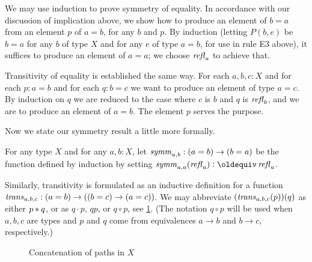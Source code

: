 We may use induction to prove symmetry of equality.  In accordance with our discussion of implication above, we show how to produce an element
of $b=a$ from an element $p$ of $a=b$, for any $b$ and $p$.  By induction (letting $P(b,e)$ be $b=a$ for any $b$ of type $X$ and for any $e$ of
type $a=b$, for use in rule E3 above), it suffices to produce an element of $a=a$; we choose $\mathop{{\it refl}_{a}}$ to achieve that.

Transitivity of equality is established the same way.  For each $a,b,c:X$ and for each $p:a=b$ and for each $q:b=c$ we want to produce an
element of type $a=c$.  By induction on $q$ we are reduced to the case where $c$ is $b$ and $q$ is $\mathop{{\it refl}_{b}}$, and we are to produce an element
of $a=b$.  The element $p$ serves the purpose.  

Now we state our symmetry result a little more formally.

\begin{definition}\label{def:eq-symm}
  For any type $X$ and for any $a,b:X$, let $\mathop{\mathit{symm}}_{a,b} : (a=b) \to (b=a)$ be the function defined by induction by setting
  $\symm_{a,a}(\refl a) \defeq \refl a$.
\end{definition}

Similarly, transitivity is formulated as an inductive definition for a function $\mathop{\mathit{trans}}_{a,b,c} : (a=b) \to ((b=c) \to (a=c))$.  We may
abbreviate $(\mathop{\mathit{trans}}_{a,b,c}(p))(q)$ as either $p* q$, 
or as $q\cdot p$, $qp$, or $q\circ p$, see \cref{fig:path-concatenation}.
(The notation $q\circ p$ will be used when $a,b,c$ are types and
$p$ and $q$ come from equivalences $a\to b$ and $b\to c$, respectively.)

\begin{figure}
  \centering
  
  \caption{Concatenation of paths in $X$}
  \label{fig:path-concatenation}
\end{figure}


